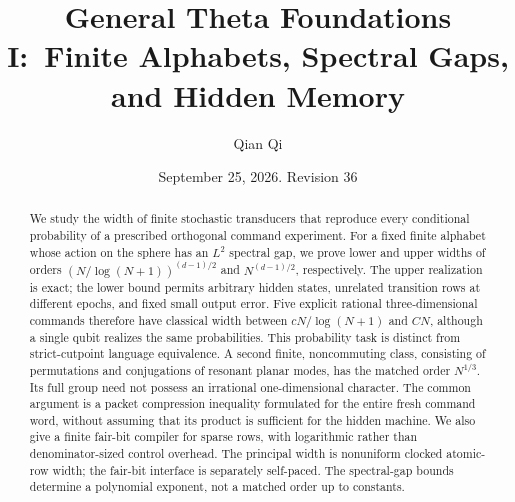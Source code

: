 \documentclass[11pt]{amsart}
\title[Finite alphabets and hidden memory]{General Theta Foundations I:\
Finite Alphabets, Spectral Gaps, and Hidden Memory}
\author{Qian Qi}
\date{September 25, 2026. Revision 36}
\theoremstyle{definition}\newtheorem{definition}[theorem]{Definition}
\theoremstyle{remark}\newtheorem{remark}[theorem]{Remark}
\begin{document}
\begin{abstract}
We study the width of finite stochastic transducers that reproduce every
conditional probability of a prescribed orthogonal command experiment.
For a fixed finite alphabet whose action on the sphere has an $L^2$
spectral gap, we prove lower and upper widths of orders
$(N/\log(N+1))^{(d-1)/2}$ and $N^{(d-1)/2}$, respectively.
The upper realization is exact; the lower bound permits arbitrary hidden
states, unrelated transition rows at different epochs, and fixed small
output error. Five explicit rational three-dimensional commands therefore
have classical width between $cN/\log(N+1)$ and $CN$, although a single
qubit realizes the same probabilities. This probability task is distinct
from strict-cutpoint language equivalence. A second finite, noncommuting
class, consisting of permutations and conjugations of resonant planar
modes, has the matched order $N^{1/3}$. Its full group need not possess an
irrational one-dimensional character. The common argument is a packet
compression inequality formulated for the entire fresh command word,
without assuming that its product is sufficient for the hidden machine.
We also give a finite fair-bit compiler for sparse rows, with logarithmic
rather than denominator-sized control overhead. The principal width is
nonuniform clocked atomic-row width; the fair-bit interface is separately
self-paced. The spectral-gap bounds determine a polynomial exponent,
not a matched order up to constants.
\end{abstract}
\maketitle









\end{document}

